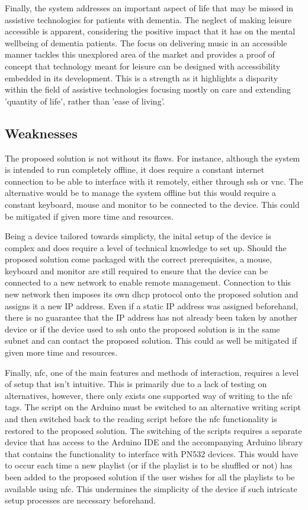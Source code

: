 Finally, the system addresses an important aspect of life that may be missed in assistive technologies for patients with dementia. The neglect of making leisure accessible is apparent, considering the positive impact that it has on the mental wellbeing of dementia patients. The focus on delivering music in an accessible manner tackles this unexplored area  of the market and provides a proof of concept that technology meant for leisure can be designed with accessibility embedded in its development. This is a strength as it highlights a disparity within the field of assistive technologies focusing mostly on care and extending 'quantity of life', rather than 'ease of living'.  

\subsection{Weaknesses}\label{subsec:weaknesses}
The proposed solution is not without its flaws. For instance, although the system is intended to run completely offline, it does require a constant internet connection to be able to interface with it remotely, either through \gls{ssh} or \gls{vnc}. The alternative would be to manage the system offline but this would require a constant keyboard, mouse and monitor to be connected to the device. This could be mitigated if given more time and resources.

Being a device tailored towards simplicty, the inital setup of the device is complex and does require a level of technical knowledge to set up. Should the proposed solution come packaged with the correct prerequisites, a mouse, keyboard and monitor are still required to ensure that the device can be connected to a new network to enable remote management. Connection to this new network then imposes its own \gls{dhcp} protocol onto the proposed solution and assigns it a new IP address. Even if a static IP address was assigned beforehand, there is no guarantee that the IP address has not already been taken by another device or if the device used to \gls{ssh} onto the proposed solution is in the same subnet and can contact the proposed solution. This could as well be mitigated if given more time and resources.

Finally, \gls{nfc}, one of the main features and methods of interaction, requires a level of setup that isn't intuitive. This is primarily due to a lack of testing on alternatives, however, there only exists one supported way of writing to the \gls{nfc} tags. The script on the Arduino must be switched to an alternative writing script and then switched back to the reading script before the \gls{nfc} functionality is restored to the proposed solution. The switching of the scripts requires a separate device that has access to the Arduino IDE and the accompanying Arduino library that contains the functionality to interface with PN532 devices. This would have to occur each time a new playlist (or if the playlist is to be shuffled or not) has been added to the proposed solution if the user wishes for all the playlists to be available using \gls{nfc}. This undermines the simplicity of the device if such intricate setup processes are necessary beforehand. 


